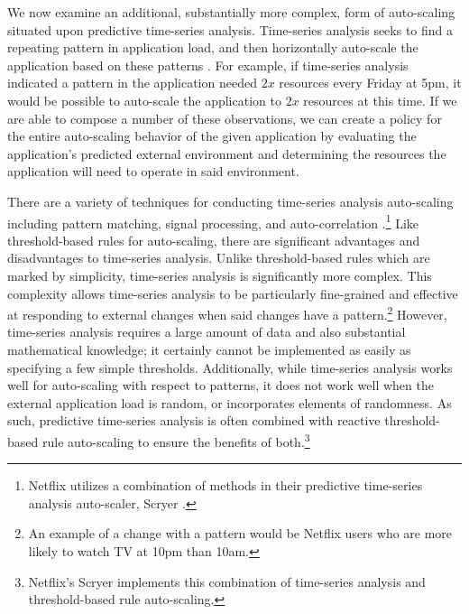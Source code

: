 We now examine an additional, substantially more complex, form of auto-scaling
situated upon predictive time-series analysis. Time-series analysis seeks to
find a repeating pattern in application load, and then horizontally auto-scale
the application based on these
patterns
\cite{auto-scaling-techniques-for-elastic-applications-in-cloud-environments}.
For example, if time-series analysis indicated a pattern in the application needed
$2x$ resources every Friday at 5pm,
it would be possible to auto-scale the application to $2x$
resources at this time. If we are able to compose a number of these
observations, we can create a policy for the entire auto-scaling behavior of
the given application by evaluating the application's predicted external environment
and determining the resources the application will need to operate in said
environment.

There are a variety of techniques for conducting time-series analysis
auto-scaling including pattern matching, signal processing, and
auto-correlation
\cite{auto-scaling-scaling-techniques-for-elastic-applications-in-cloud-environments}.\footnote{Netflix utilizes a combination of methods in
their predictive time-series analysis auto-scaler,
Scryer \cite{netflix-scryer-part-ii}.}
Like threshold-based rules for auto-scaling, there are significant
advantages and disadvantages to time-series analysis. Unlike threshold-based
rules which are marked by simplicity, time-series analysis is significantly more
complex. This complexity allows time-series analysis to be particularly 
fine-grained and effective
at responding to external changes when said changes have a pattern.\footnote{An
example of a change with a pattern would be Netflix users who are more likely to
watch TV at 10pm than 10am.} However, time-series analysis requires a
large amount of data and also substantial mathematical
knowledge; it certainly cannot be implemented as easily as specifying a few
simple thresholds. Additionally, while time-series analysis works well for
auto-scaling with respect to patterns, it does not work well when the external
application load is random, or incorporates elements of randomness. As such,
predictive time-series analysis is
often combined with reactive threshold-based rule auto-scaling to ensure the benefits of
both.\footnote{Netflix's Scryer implements this combination of
time-series analysis and threshold-based rule
auto-scaling.\cite{netflix-scryer-part-ii}}

